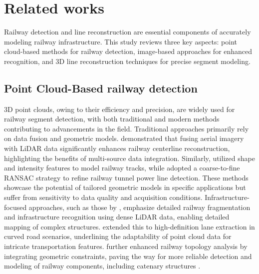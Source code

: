 \section{Related works}

Railway detection and line reconstruction are essential components of accurately modeling railway infrastructure. This study reviews three key aspects: point cloud-based methods for railway detection, image-based approaches for enhanced recognition, and 3D line reconstruction techniques for precise segment modeling.

\subsection{Point Cloud-Based railway detection}
3D point clouds, owing to their efficiency and precision, are widely used for railway segment detection, with both traditional and modern methods contributing to advancements in the field.
Traditional approaches primarily rely on data fusion and geometric models. \cite{Beger2011} demonstrated that fusing aerial imagery with LiDAR data significantly enhances railway centerline reconstruction, highlighting the benefits of multi-source data integration. Similarly, \cite{Yang2014} utilized shape and intensity features to model railway tracks, while \cite{SanchezRodriguez2019} adopted a coarse-to-fine RANSAC strategy to refine railway tunnel power line detection. These methods showcase the potential of tailored geometric models in specific applications but suffer from sensitivity to data quality and acquisition conditions.
Infrastructure-focused approaches, such as those by \cite{Cserep2022}, emphasize detailed railway fragmentation and infrastructure recognition using dense LiDAR data, enabling detailed mapping of complex structures. 
\cite{Ye2022} extended this to high-definition lane extraction in curved road scenarios, underlining the adaptability of point cloud data for intricate transportation features. 
\cite{Ariyachandra2023} further enhanced railway topology analysis by integrating geometric constraints, paving the way for more reliable detection and modeling of railway components, including catenary structures \citep{Zhang2023a}.

